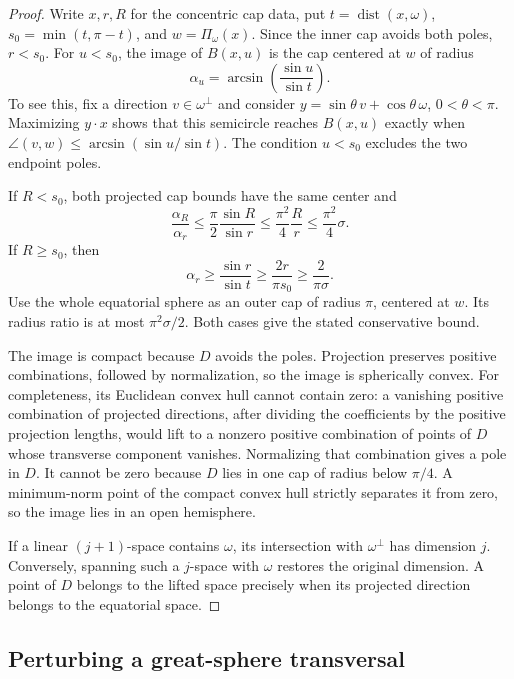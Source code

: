 \documentclass[11pt]{article}
\theoremstyle{remark}
\newcommand{\dist}{\operatorname{dist}}
\begin{document}
\begin{proof}
Write \(x,r,R\) for the concentric cap data, put
\(t=\dist(x,\omega)\), \(s_0=\min(t,\pi-t)\), and
\(w=\Pi_\omega(x)\).
Since the inner cap avoids both poles, \(r<s_0\).
For \(u<s_0\), the image of \(B(x,u)\) is the cap centered at \(w\)
of radius
\begin{equation}
 \alpha_u=\arcsin\!\left(\frac{\sin u}{\sin t}\right).
 \label{eq:cap-projection}
\end{equation}
To see this, fix a direction \(v\in\omega^\perp\) and consider
\(y=\sin\theta\,v+\cos\theta\,\omega\), \(0<\theta<\pi\).
Maximizing \(y\cdot x\) shows that this semicircle reaches \(B(x,u)\)
exactly when
\(\angle(v,w)\leq\arcsin(\sin u/\sin t)\).
The condition \(u<s_0\) excludes the two endpoint poles.

If \(R<s_0\), both projected cap bounds have the same center and
\[
 \frac{\alpha_R}{\alpha_r}
 \leq\frac{\pi}{2}\frac{\sin R}{\sin r}
 \leq\frac{\pi^2}{4}\frac{R}{r}
 \leq\frac{\pi^2}{4}\sigma.
\]
If \(R\geq s_0\), then
\[
 \alpha_r\geq\frac{\sin r}{\sin t}
 \geq\frac{2r}{\pi s_0}\geq\frac{2}{\pi\sigma}.
\]
Use the whole equatorial sphere as an outer cap of radius \(\pi\),
centered at \(w\). Its radius ratio is at most \(\pi^2\sigma/2\).
Both cases give the stated conservative bound.

The image is compact because \(D\) avoids the poles.
Projection preserves positive combinations, followed by normalization,
so the image is spherically convex.
For completeness, its Euclidean convex hull cannot contain zero:
a vanishing positive combination of projected directions, after dividing
the coefficients by the positive projection lengths, would lift to a
nonzero positive combination of points of \(D\) whose transverse
component vanishes. Normalizing that combination gives a pole in \(D\).
It cannot be zero because \(D\) lies in one cap of radius below
\(\pi/4\).
A minimum-norm point of the compact convex hull strictly separates it
from zero, so the image lies in an open hemisphere.

If a linear \((j+1)\)-space contains \(\omega\), its intersection with
\(\omega^\perp\) has dimension \(j\).
Conversely, spanning such a \(j\)-space with \(\omega\) restores the
original dimension. A point of \(D\) belongs to the lifted space
precisely when its projected direction belongs to the equatorial space.
\end{proof}

\subsection{Perturbing a great-sphere transversal}
\end{document}
